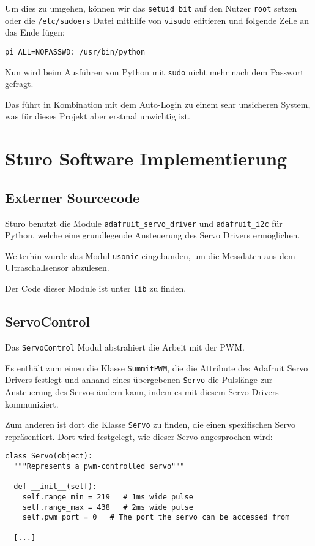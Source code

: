 \documentclass[a4paper,10pt]{scrartcl}
\begin{document}
    Um dies zu umgehen, können wir das \lstinline{setuid bit} auf den Nutzer
    \lstinline{root} setzen oder die \lstinline{/etc/sudoers} Datei mithilfe von
    \lstinline{visudo} editieren und folgende Zeile an das Ende fügen:
    \begin{lstlisting}
pi ALL=NOPASSWD: /usr/bin/python
    \end{lstlisting}

    Nun wird beim Ausführen von Python mit \lstinline{sudo} nicht mehr nach dem
    Passwort gefragt.

    Das führt in Kombination mit dem Auto-Login zu einem sehr unsicheren System,
    was für dieses Projekt aber erstmal unwichtig ist.

\section{Sturo Software Implementierung}

  \subsection{Externer Sourcecode}
    Sturo benutzt die Module \lstinline{adafruit_servo_driver} und
    \lstinline{adafruit_i2c} für Python, welche eine grundlegende Ansteuerung
    des Servo Drivers ermöglichen. \cite{adafruitlearn}

    Weiterhin wurde das Modul \lstinline{usonic} eingebunden, um die Messdaten
    aus dem Ultraschallsensor abzulesen. \cite{ultrasonic}

    Der Code dieser Module ist unter \lstinline{lib} zu finden.

  \subsection{ServoControl}

    Das \lstinline{ServoControl} Modul abstrahiert die Arbeit mit der PWM.

    Es enthält zum einen die Klasse \lstinline{SummitPWM}, die die Attribute des
    Adafruit Servo Drivers festlegt und anhand eines übergebenen
    \lstinline{Servo} die Pulslänge zur Ansteuerung des Servos ändern kann,
    indem es mit diesem Servo Drivers kommuniziert.

    Zum anderen ist dort die Klasse \lstinline{Servo} zu finden, die einen
    spezifischen Servo repräsentiert.
    Dort wird festgelegt, wie dieser Servo angesprochen wird:
    \begin{lstlisting}
class Servo(object):
  """Represents a pwm-controlled servo"""

  def __init__(self):
    self.range_min = 219   # 1ms wide pulse
    self.range_max = 438   # 2ms wide pulse
    self.pwm_port = 0   # The port the servo can be accessed from

  [...]
    \end{lstlisting}
\end{document}
